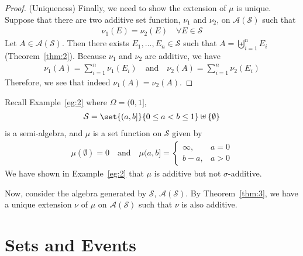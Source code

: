 \documentclass[thmcnt=section, 12pt, color=purple]{my-elegantbook}
\begin{document}
\begin{proof}
	(Uniqueness) Finally, we need to show the extension of $\mu$
	is unique.
	Suppose that there are two additive set function, $\nu_1$ and $\nu_2$,
	on $\mathcal{A}(\mathcal{S})$ such that 
	\begin{align*}
		\nu_1(E) = \nu_2(E)
		\quad \forall E \in \mathcal{S}
	\end{align*}
	Let $A \in \mathcal{A}(\mathcal{S})$.
	Then there exists $E_1, \ldots, E_n \in \mathcal{S}$
	such that $A = \biguplus_{i=1}^n E_i$ (Theorem~\ref{thm:2}).
	Because $\nu_1$ and $\nu_2$ are additive,
	we have 
	\begin{align*}
		\nu_1(A) = \sum_{i=1}^n \nu_1(E_i)
		\quad \text{and} \quad
		\nu_2(A) = \sum_{i=1}^n \nu_2(E_i)
	\end{align*}
	Therefore, we see that indeed $\nu_1(A) = \nu_2(A)$.
\end{proof}


\begin{example} \label{eg:4}
	Recall Example~\ref{eg:2}
	where $\Omega = (0, 1]$,
	\begin{align*}
		\mathcal{S} = \set{(a, b]}{0 \leq a < b \leq 1}
		\uplus \{\emptyset\}
	\end{align*}
	is a semi-algebra, and $\mu$ is a set function 
	on $\mathcal{S}$ given by 
	\begin{align*}
		\mu (\emptyset) = 0
		\quad \text{and} \quad
		\mu (a, b] = \begin{cases}
			\infty,
			&a=0 \\
			b - a,
			&a > 0
		\end{cases}
	\end{align*}
	We have shown in Example~\ref{eg:2} that $\mu$ is additive
	but not $\sigma$-additive.

	Now, consider the algebra generated 
	by $\mathcal{S}$, $\mathcal{A}(\mathcal{S})$.
	By Theorem~\ref{thm:3}, we have a unique extension $\nu$
	of $\mu$ on $\mathcal{A}(\mathcal{S})$
	such that $\nu$ is also additive.
\end{example}


\begin{theorem} \label{thm:1}
\end{theorem}


\chapter{Sets and Events}
\end{document}
